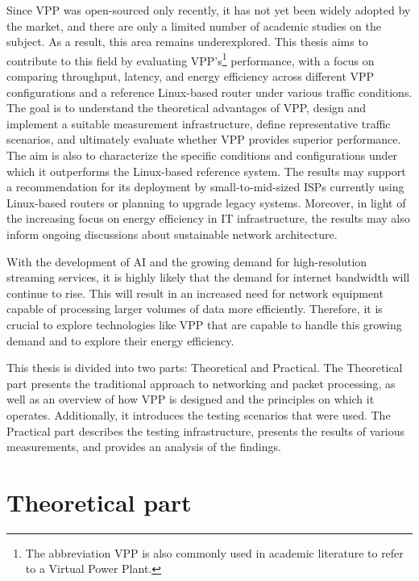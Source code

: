 Since VPP was open-sourced only recently, it has not yet been widely adopted by the market, and there are only a limited number of academic studies on the subject. As a result, this area remains underexplored. 
This thesis aims to contribute to this field by evaluating VPP's\footnote{The abbreviation VPP is also commonly used in academic literature to refer to a Virtual Power Plant.} performance, 
with a focus on comparing throughput, latency, and energy efficiency across different VPP configurations and a reference Linux-based router under various traffic conditions.
The goal is to understand the theoretical advantages of VPP, design and implement a suitable measurement infrastructure, define representative traffic scenarios, 
and ultimately evaluate whether VPP provides superior performance. The aim is also to characterize the specific conditions and configurations under which it outperforms the Linux-based reference system.
The results may support a recommendation for its deployment by small-to-mid-sized ISPs currently using Linux-based routers or planning to upgrade legacy systems.
Moreover, in light of the increasing focus on energy efficiency in IT infrastructure, the results may also inform ongoing discussions about sustainable network architecture.

With the development of AI and the growing demand for high-resolution streaming services, it is highly likely that the demand for internet bandwidth will continue to rise. 
This will result in an increased need for network equipment capable of processing larger volumes of data more efficiently. 
Therefore, it is crucial to explore technologies like VPP that are capable to handle this growing demand and to explore their energy efficiency.

This thesis is divided into two parts: Theoretical and Practical. 
The Theoretical part presents the traditional approach to networking and packet processing, as well as an overview of how VPP is designed and the principles on which it operates. 
Additionally, it introduces the testing scenarios that were used. 
The Practical part describes the testing infrastructure, presents the results of various measurements, and provides an analysis of the findings.

\chapter{Theoretical part}

